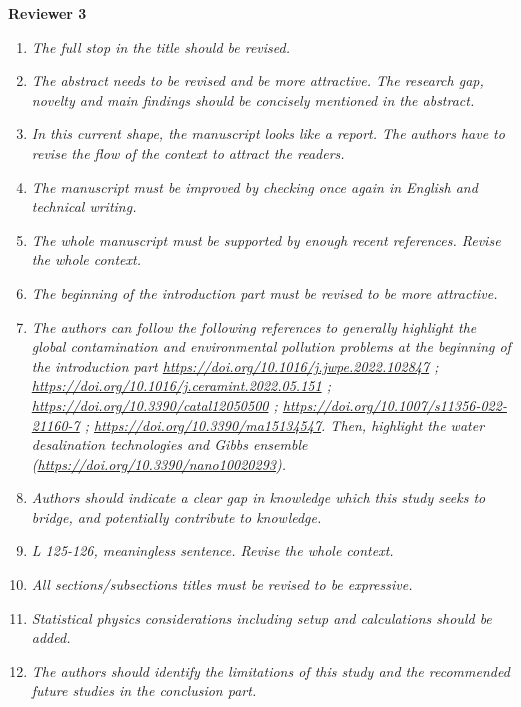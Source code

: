 \documentclass[12pt]{dinbrief}
\begin{document}
\textbf{Reviewer 3}

\textit{}
\begin{enumerate}
\item \textit{The full stop in the title should be revised.}
\item \textit{The abstract needs to be revised and be more attractive. The research gap, novelty and main findings should be concisely mentioned in the abstract.}
\item \textit{In this current shape, the manuscript looks like a report. The authors have to revise the flow of the context to attract the readers.}
\item \textit{The manuscript must be improved by checking once again in English and technical writing. }

\item \textit{The whole manuscript must be supported by enough recent references. Revise the whole context.}
\item \textit{The beginning of the introduction part must be revised to be more attractive.}
\item \textit{The authors can follow the following references to generally highlight the global contamination and environmental pollution problems at the beginning of the introduction part  \href{https://doi.org/10.1016/j.jwpe.2022.102847}{https://doi.org/10.1016/j.jwpe.2022.102847} ; \href{https://doi.org/10.1016/j.ceramint.2022.05.151}{https://doi.org/10.1016/j.ceramint.2022.05.151} ; 
\href{https://doi.org/10.3390/catal12050500}{https://doi.org/10.3390/catal12050500} ; 
\href{https://doi.org/10.1007/s11356-022-21160-7}{https://doi.org/10.1007/s11356-022-21160-7} ; 
\href{https://doi.org/10.3390/ma15134547}{https://doi.org/10.3390/ma15134547}. 
Then, highlight the water desalination technologies and Gibbs ensemble (\href{https://doi.org/10.3390/nano10020293}{https://doi.org/10.3390/nano10020293}).}
\item \textit{Authors should indicate a clear gap in knowledge which this study seeks to bridge, and potentially contribute to knowledge. }

\item \textit{L 125-126, meaningless sentence. Revise the whole context.}
\item \textit{All sections/subsections titles must be revised to be expressive.}
\item \textit{Statistical physics considerations including setup and calculations should be added.}
\item \textit{The authors should identify the limitations of this study and the recommended future studies in the conclusion part.
}
\end{enumerate}








\end{document}
